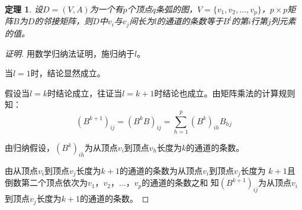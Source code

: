 \documentclass{article}
\begin{document}
\begin{CJK}{UTF8}{gbsn}
  \newtheorem*{Thm}{定理}
  \huge
  \begin{Thm}
    设$D=(V,A)$为一个有$p$个顶点$q$条弧的图，$V=\{v_1,v_2,\ldots,v_p\}$，$p\times p$矩阵$B$为$D$的邻接矩阵，则$D$中$v_i$与$v_j$间长为$l$的通道的条数等于$B^l$的第$i$行第$j$列元素的值。
  \end{Thm}
  \begin{proof}[证明]
      用数学归纳法证明，施归纳于$l$。

  当$l=1$时，结论显然成立。

  假设当$l=k$时结论成立，往证当$l=k+1$时结论也成立。由矩阵乘法的计算规则知：
  \[(B^{k+1})_{ij} = (B^{k}B)_{ij} = \sum_{h=1}^p(B^k)_{ih}B_{hj}\]

  由归纳假设，$(B^k)_{ih}$为从顶点$v_i$到顶点$v_h$长度为$k$的通道的条数。

  由从顶点$v_i$到顶点$v_j$长度为$k+1$的通道的条数为从顶点$v_i$到顶点$v_j$长度为
  $k+1$且倒数第二个顶点依次为$v_1$，$v_2$，$\ldots$，$v_p$的通道的条数之和
  知$(B^{k+1})_{ij}$为从顶点$v_i$到顶点$v_j$长度为$k+1$的通道的条数。
  \end{proof}

\end{CJK}
\end{document}
